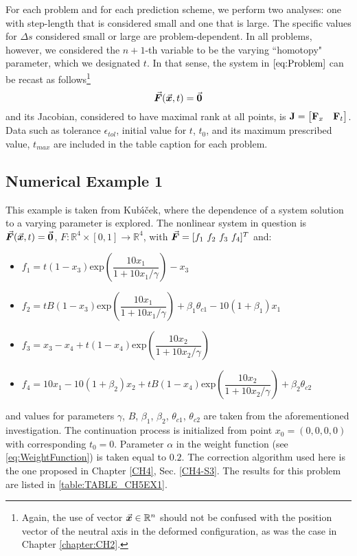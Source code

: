 For each problem and for each prediction scheme, we perform two analyses: one
with step-length that is considered small and one that is large. The specific 
values
for $\Delta s$ considered small or large are problem-dependent. In all
problems, however, we considered the $n+1$-th variable to be the varying 
``homotopy"
parameter, which we designated $t$. In that sense, the system in
$\ref{eq:Problem}$ can be recast as follows\footnote{Again, the use of vector 
$\vec{\bm{x}}\in\mathbb{R}^n$ should not be confused with the position vector of 
the neutral axis in the deformed configuration, as was the case in Chapter 
\ref{chapter:CH2}.}
\begin{equation}
	\vec{\bm{F}}(\vec{\bm{x}},t)=\vec{\bm{0}}
	\label{eq:MProb}
\end{equation}
and its Jacobian, considered to have maximal rank at all points, is $\mathbf{J} =
\begin{bmatrix}
	\mathbf{F}_x & \mathbf{F}_t
\end{bmatrix}
$. Data such as tolerance $\epsilon_{tol}$, initial value for $t$,
$t_0$, and its maximum prescribed value, $t_{max}$ are included in
the table caption for each problem.

\subsection{Numerical Example 1}

This example is taken from Kub{\'\i}{\v{c}}ek\cite{Kubicek76}, where the
dependence of a system solution to a varying parameter is explored. The 
nonlinear
system in question is $\vec{\bm{F}}(\vec{\bm{x}},t)=\vec{\bm{0}}$,
$F:\mathbb{R}^4\times[0,1]\rightarrow\mathbb{R}^4$, with $\bvec{F}=[f_1\ f_2\ 
f_3\ f_4]^T$ and:
\begin{itemize}
	\item[] $f_1 = 
	t(1-x_3)\text{exp}(\dfrac{10x_1}{1+10x_1^{}/\gamma})-x_3$
	\item[] $f_2 = t
	B(1-x_3)\text{exp}(\dfrac{10x_1}{1+10x_1^{}/\gamma})+\beta_1\theta_{c1}-10(1+\beta_1)x_1$
	\item[] $f_3 = x_3-x_4+t(1-x_4)\text{exp}(\dfrac{10x_2}{1+10x_2^{}/\gamma})$
	\item[] $f_4 = 10x_1-10(1+ \beta_2)x_2+t
	B(1-x_4)\text{exp}(\dfrac{10x_2}{1+10x_2^{}/\gamma})+\beta_2\theta_{c2}$
\end{itemize}
and values for parameters $\gamma$, $B$, $\beta_1$, $\beta_2$, $\theta_{c1}$,
$\theta_{c2}$ are taken from the aforementioned investigation. The continuation
process is initialized from point $x_0=(0,0,0,0)$ with corresponding
$t_0=0$. Parameter $\alpha$ in the weight function (see
\ref{eq:WeightFunction}) is taken equal to $0.2$. The correction algorithm used
here is the one proposed in Chapter \ref{CH4}, Sec. \ref{CH4-S3}. The results 
for this problem are listed in \ref{table:TABLE_CH5EX1}. 

